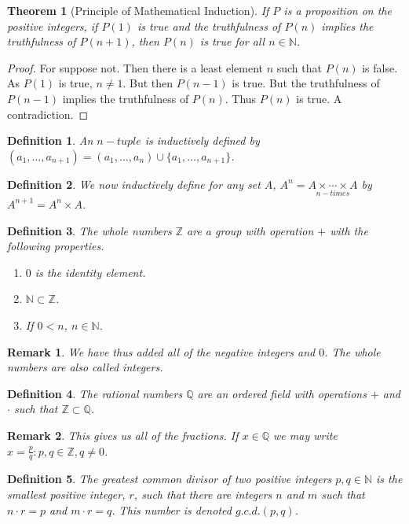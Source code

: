 \documentclass[crop=false,class=book]{standalone}
\theoremstyle{mystyle}
\newtheorem{theorem}{Theorem}[section]
\newtheorem{definition}{Definition}[section]
\newtheorem{remark}{Remark}[section]
\begin{document}
\begin{theorem}[Principle of Mathematical Induction]
If $P$ is a proposition on the positive integers, if $P(1)$ is true and the truthfulness of $P(n)$ implies the truthfulness of $P(n+1)$, then $P(n)$ is true for all $n\in \mathbb{N}$.
\end{theorem}
\begin{proof}
For suppose not. Then there is a least element $n$ such that $P(n)$ is false. As $P(1)$ is true, $n\ne 1$. But then $P(n-1)$ is true. But the truthfulness of $P(n-1)$ implies the truthfulness of $P(n)$. Thus $P(n)$ is true. A contradiction.
\end{proof}
\begin{definition}
An $n-tuple$ is inductively defined by $(a_1,\hdots,a_{n+1}) = (a_1,\hdots, a_n)\cup \{a_1,\hdots,a_{n+1}\}$.
\end{definition}
\begin{definition}
We now inductively define for any set $A$, $A^{n} = \underset{n-times}{A\times \cdots \times A}$ by $A^{n+1} = A^n \times A$.
\end{definition}
\begin{definition}
The whole numbers $\mathbb{Z}$ are a group with operation $+$ with the following properties.
\begin{enumerate}
\item $0$ is the identity element.
\item $\mathbb{N}\subset \mathbb{Z}$.
\item If $0<n$, $n\in \mathbb{N}$.
\end{enumerate}
\end{definition}
\begin{remark}
We have thus added all of the negative integers and $0$. The whole numbers are also called integers.
\end{remark}
\begin{definition}
The rational numbers $\mathbb{Q}$ are an ordered field with operations $+$ and $\cdot$ such that $\mathbb{Z}\subset \mathbb{Q}$.
\end{definition}
\begin{remark}
This gives us all of the fractions. If $x\in \mathbb{Q}$ we may write $x= \frac{p}{q}:p,q\in \mathbb{Z}, q\ne 0$.
\end{remark}
\begin{definition}
The greatest common divisor of two positive integers $p,q\in \mathbb{N}$ is the smallest positive integer, $r$, such that there are integers $n$ and $m$ such that $n\cdot r = p$ and $m\cdot r = q$. This number is denoted $g.c.d.(p,q)$.
\end{definition}
\end{document}

